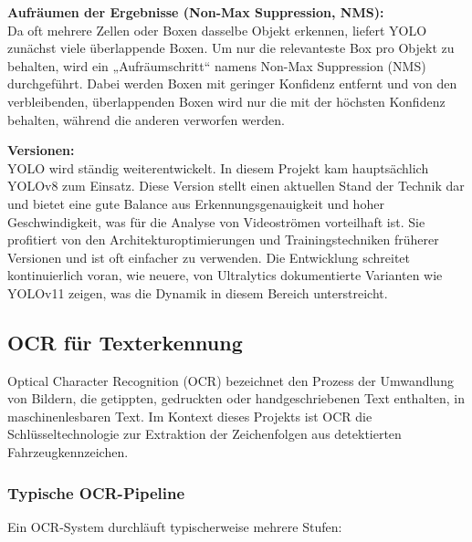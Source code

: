 \textbf{Aufräumen der Ergebnisse (Non-Max Suppression, NMS):} \\
Da oft mehrere Zellen oder Boxen dasselbe Objekt erkennen, liefert YOLO zunächst viele überlappende Boxen. Um nur die relevanteste Box pro Objekt zu behalten, wird ein „Aufräumschritt“ namens Non-Max Suppression (NMS) durchgeführt. Dabei werden Boxen mit geringer Konfidenz entfernt und von den verbleibenden, überlappenden Boxen wird nur die mit der höchsten Konfidenz behalten, während die anderen verworfen werden.

\textbf{Versionen:} \\
YOLO wird ständig weiterentwickelt. In diesem Projekt kam hauptsächlich YOLOv8 zum Einsatz. Diese Version stellt einen aktuellen Stand der Technik dar und bietet eine gute Balance aus Erkennungsgenauigkeit und hoher Geschwindigkeit, was für die Analyse von Videoströmen vorteilhaft ist. Sie profitiert von den Architekturoptimierungen und Trainingstechniken früherer Versionen und ist oft einfacher zu verwenden. Die Entwicklung schreitet kontinuierlich voran, wie neuere, von Ultralytics dokumentierte Varianten wie YOLOv11 zeigen, was die Dynamik in diesem Bereich unterstreicht.

\subsection{OCR für Texterkennung}

Optical Character Recognition (OCR) bezeichnet den Prozess der Umwandlung von Bildern, die getippten, gedruckten oder handgeschriebenen Text enthalten, in maschinenlesbaren Text. Im Kontext dieses Projekts ist OCR die Schlüsseltechnologie zur Extraktion der Zeichenfolgen aus detektierten Fahrzeugkennzeichen.

\subsubsection{Typische OCR-Pipeline}
Ein OCR-System durchläuft typischerweise mehrere Stufen:

